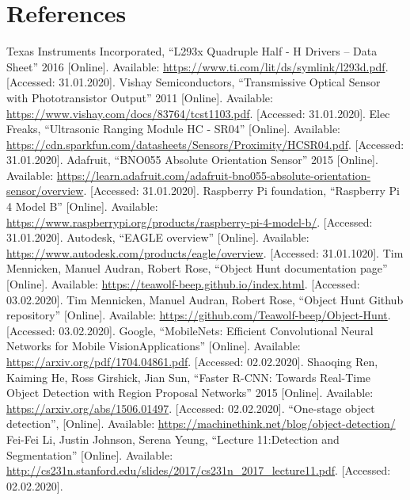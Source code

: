\newpage

\section{References}
\begin{flushleft}
\begin{thebibliography}{99}
 Texas Instruments Incorporated, ``L293x Quadruple Half - H Drivers -- Data Sheet'' 2016 [Online]. Available: \url{https://www.ti.com/lit/ds/symlink/l293d.pdf}. [Accessed: 31.01.2020].
 Vishay Semiconductors, ``Transmissive Optical Sensor with Phototransistor Output'' 2011 [Online]. Available: \url{https://www.vishay.com/docs/83764/tcst1103.pdf}. [Accessed: 31.01.2020].
 Elec Freaks, ``Ultrasonic Ranging Module HC - SR04'' [Online]. Available: \url{https://cdn.sparkfun.com/datasheets/Sensors/Proximity/HCSR04.pdf}. [Accessed: 31.01.2020].
 Adafruit, ``BNO055 Absolute Orientation Sensor'' 2015 [Online]. Available: \url{https://learn.adafruit.com/adafruit-bno055-absolute-orientation-sensor/overview}. [Accessed: 31.01.2020].
 Raspberry Pi foundation, ``Raspberry Pi 4 Model B'' [Online]. Available: \url{https://www.raspberrypi.org/products/raspberry-pi-4-model-b/}. [Accessed: 31.01.2020].
 Autodesk, ``EAGLE overview'' [Online]. Available: \url{https://www.autodesk.com/products/eagle/overview}. [Accessed: 31.01.1020].
 Tim Mennicken, Manuel Audran, Robert Rose, ``Object Hunt documentation page'' [Online]. Available: \url{https://teawolf-beep.github.io/index.html}. [Accessed: 03.02.2020].
 Tim Mennicken, Manuel Audran, Robert Rose, ``Object Hunt Github repository'' [Online]. Available: \url{https://github.com/Teawolf-beep/Object-Hunt}. [Accessed: 03.02.2020].
 Google, ``MobileNets: Efficient Convolutional Neural Networks for Mobile VisionApplications'' [Online]. Available: \url{https://arxiv.org/pdf/1704.04861.pdf}. [Accessed: 02.02.2020].
 Shaoqing Ren, Kaiming He, Ross Girshick, Jian Sun, ``Faster R-CNN: Towards Real-Time Object Detection with Region Proposal Networks'' 2015 [Online]. Available: \url{https://arxiv.org/abs/1506.01497}. [Accessed: 02.02.2020].
 ``One-stage object detection'', [Online]. Available: \url{https://machinethink.net/blog/object-detection/}
 Fei-Fei Li, Justin Johnson, Serena Yeung, ``Lecture 11:Detection and Segmentation'' [Online]. Available: \url{http://cs231n.stanford.edu/slides/2017/cs231n_2017_lecture11.pdf}. [Accessed: 02.02.2020].

\end{thebibliography}
\end{flushleft}
